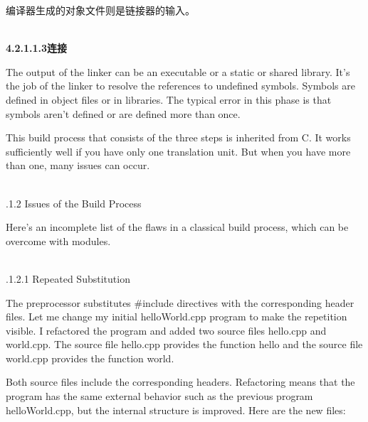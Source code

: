 编译器生成的对象文件则是链接器的输入。

\hspace*{\fill} \\ %
\noindent
\textbf{4.2.1.1.3\hspace{0.2cm}连接}

The output of the linker can be an executable or a static or shared library. It’s the job of the linker to resolve the references to undefined symbols. Symbols are defined in object files or in libraries. The typical error in this phase is that symbols aren’t defined or are defined more than once.

This build process that consists of the three steps is inherited from C. It works sufficiently well if you have only one translation unit. But when you have more than one, many issues can occur.

\hspace*{\fill} \\ %
.1.2\hspace{0.2cm} Issues of the Build Process

Here’s an incomplete list of the flaws in a classical build process, which can be overcome with modules.

\hspace*{\fill} \\ %
.1.2.1\hspace{0.2cm} Repeated Substitution

The preprocessor substitutes \#include directives with the corresponding header files. Let me change my initial helloWorld.cpp program to make the repetition visible. I refactored the program and added two source files hello.cpp and world.cpp. The source file hello.cpp provides the function hello and the source file world.cpp provides the function world.

Both source files include the corresponding headers. Refactoring means that the program has the same external behavior such as the previous program helloWorld.cpp, but the internal structure is improved. Here are the new files:


